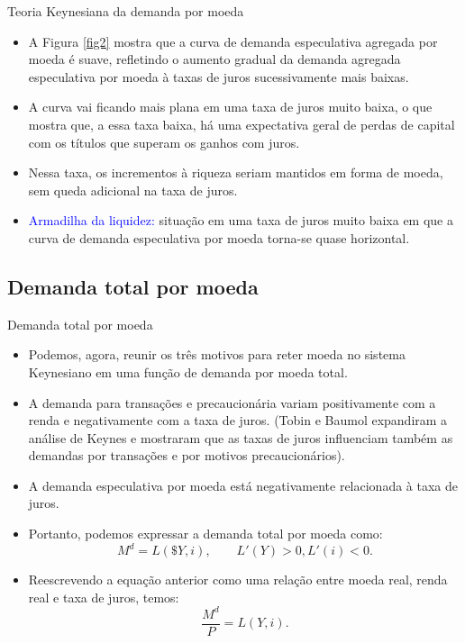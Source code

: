 \documentclass[10pt]{beamer}
\begin{document}
\begin{frame}{Teoria Keynesiana da demanda por moeda}
\begin{itemize}
    \item A Figura \ref{fig2} mostra que a curva de demanda especulativa agregada por moeda é suave, refletindo o aumento gradual da demanda agregada especulativa por moeda à taxas de juros sucessivamente mais baixas.
    \bigskip
    \item A curva vai ficando mais plana em uma taxa de juros muito baixa, o que mostra que, a essa taxa baixa, há uma expectativa geral de perdas de capital com os títulos que superam os ganhos com juros.
    \bigskip
    \item Nessa taxa, os incrementos à riqueza seriam mantidos em forma de moeda, sem queda adicional na taxa de juros.
    \bigskip
    \item \textcolor{blue}{Armadilha da liquidez:} situação em uma taxa de juros muito baixa em que a curva de demanda especulativa por moeda torna-se quase horizontal.
\end{itemize}
\end{frame}

\subsection{Demanda total por moeda}
\begin{frame}{Demanda total por moeda}
\begin{itemize}
    \item Podemos, agora, reunir os três motivos para reter moeda no sistema Keynesiano em uma função de demanda por moeda total.
    \bigskip
    \item A demanda para transações e precaucionária variam positivamente com a renda e negativamente com a taxa de juros. (Tobin e Baumol expandiram a análise de Keynes e mostraram que as taxas de juros influenciam também as demandas por transações e por motivos precaucionários).
    \bigskip
    \item A demanda especulativa por moeda está negativamente relacionada à taxa de juros.
    \bigskip
    \item Portanto, podemos expressar a demanda total por moeda como:
    \begin{equation}
        M^d = L(\$ Y, i), \qquad L'(Y) > 0, L'(i) < 0.
    \end{equation}
    \bigskip
    \item Reescrevendo a equação anterior como uma relação entre moeda real, renda real e taxa de juros, temos:
    \begin{equation}
        \frac{M^d}{P} = L(Y,i).
    \end{equation}
\end{itemize}
\end{frame}
\end{document}
